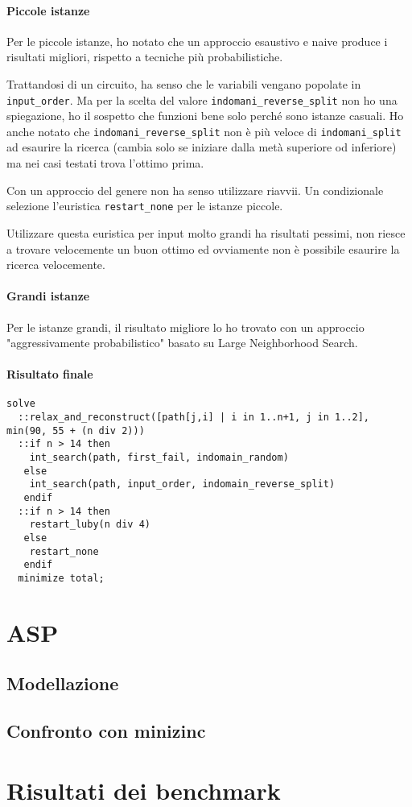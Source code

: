 \documentclass[12pt, a4paper]{article}
\begin{document}
\paragraph{Piccole istanze}
Per le piccole istanze, ho notato che un approccio esaustivo e naive produce i risultati migliori, rispetto a tecniche più probabilistiche.

Trattandosi di un circuito, ha senso che le variabili vengano popolate in \lstinline{input_order}. Ma per la scelta del valore \lstinline{indomani_reverse_split} non ho una spiegazione, ho il sospetto che funzioni bene solo perché sono istanze casuali.
Ho anche notato che \lstinline{indomani_reverse_split} non è più veloce di \lstinline{indomani_split} ad esaurire la ricerca (cambia solo se iniziare dalla metà superiore od inferiore) ma nei casi testati trova l'ottimo prima.

Con un approccio del genere non ha senso utilizzare riavvii. Un condizionale selezione l'euristica \lstinline{restart_none} per le istanze piccole.

Utilizzare questa euristica per input molto grandi ha risultati pessimi, non riesce a trovare velocemente un buon ottimo ed ovviamente non è possibile esaurire la ricerca velocemente.

\paragraph{Grandi istanze}
Per le istanze grandi, il risultato migliore lo ho trovato con un approccio "aggressivamente probabilistico" basato su Large Neighborhood Search.

\paragraph{Risultato finale}
\begin{lstlisting}[language=minizinc]
solve 
  ::relax_and_reconstruct([path[j,i] | i in 1..n+1, j in 1..2], min(90, 55 + (n div 2)))
  ::if n > 14 then 
    int_search(path, first_fail, indomain_random) 
   else 
    int_search(path, input_order, indomain_reverse_split) 
   endif
  ::if n > 14 then
    restart_luby(n div 4) 
   else 
    restart_none
   endif
  minimize total;
\end{lstlisting}

\section{ASP}

\subsection{Modellazione}

\subsection{Confronto con minizinc}

\section{Risultati dei benchmark}
\end{document}
